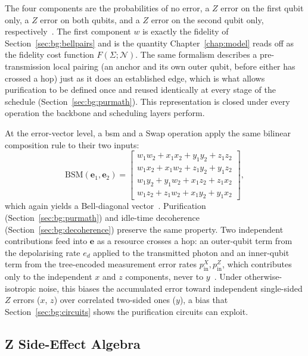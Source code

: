 The four components are the probabilities of no error, a $Z$ error on the first qubit only, a $Z$ error on both qubits, and a $Z$ error on the second qubit only, respectively~\cite{Benchasattabuse2025Integrating}. The first component $w$ is exactly the fidelity of Section~\ref{sec:bg:bellpairs} and is the quantity Chapter~\ref{chap:model} reads off as the fidelity cost function $F(\Sigma;\mathcal{N})$. The same formalism describes a pre-transmission local pairing (an anchor and its own outer qubit, before either has crossed a hop) just as it does an established edge, which is what allows purification to be defined once and reused identically at every stage of the schedule (Section~\ref{sec:bg:purmath}). This representation is closed under every operation the backbone and scheduling layers perform.

At the error-vector level, a \Gls{bsm} and a Swap operation apply the same bilinear composition rule to their two inputs:
\begin{equation}
    \mathrm{BSM}(\mathbf{e}_1,\mathbf{e}_2) =
    \begin{bmatrix}
        w_1 w_2 + x_1 x_2 + y_1 y_2 + z_1 z_2 \\
        w_1 x_2 + x_1 w_2 + z_1 y_2 + y_1 z_2 \\
        w_1 y_2 + y_1 w_2 + x_1 z_2 + z_1 x_2 \\
        w_1 z_2 + z_1 w_2 + x_1 y_2 + y_1 x_2
    \end{bmatrix},
    \label{eq:bsmcompose}
\end{equation}
which again yields a Bell-diagonal vector~\cite{Benchasattabuse2025Integrating,Benchasattabuse2026Bridging}. Purification (Section~\ref{sec:bg:purmath}) and idle-time decoherence (Section~\ref{sec:bg:decoherence}) preserve the same property. Two independent contributions feed into $\mathbf{e}$ as a resource crosses a hop: an outer-qubit term from the depolarising rate $e_d$ applied to the transmitted photon and an inner-qubit term from the tree-encoded measurement error rates $p^X_{\mathrm{in}}, p^Z_{\mathrm{in}}$, which contributes only to the independent $x$ and $z$ components, never to $y$~\cite{Benchasattabuse2026Bridging}. Under otherwise-isotropic noise, this biases the accumulated error toward independent single-sided $Z$ errors ($x$, $z$) over correlated two-sided ones ($y$), a bias that Section~\ref{sec:bg:circuits} shows the purification circuits can exploit.

\subsection{Z Side-Effect Algebra}
\label{sec:bg:sideffects}

